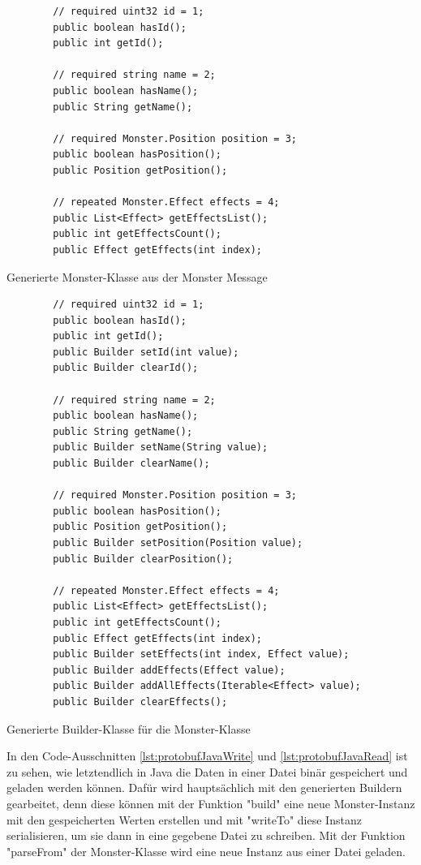 \begin{listing}[htp]
    \begin{verbatim} 
        // required uint32 id = 1;
        public boolean hasId();
        public int getId();

        // required string name = 2;
        public boolean hasName();
        public String getName();

        // required Monster.Position position = 3;
        public boolean hasPosition();
        public Position getPosition();

        // repeated Monster.Effect effects = 4;
        public List<Effect> getEffectsList();
        public int getEffectsCount();
        public Effect getEffects(int index);
    \end{verbatim}
    \caption{Generierte Monster-Klasse aus der Monster Message}
    \label{lst:protoJavaGeneratedMonster}
\end{listing}

\begin{listing}[htp]
    \begin{verbatim} 
        // required uint32 id = 1;
        public boolean hasId();
        public int getId();
        public Builder setId(int value);
        public Builder clearId();

        // required string name = 2;
        public boolean hasName();
        public String getName();
        public Builder setName(String value);
        public Builder clearName();

        // required Monster.Position position = 3;
        public boolean hasPosition();
        public Position getPosition();
        public Builder setPosition(Position value);
        public Builder clearPosition();

        // repeated Monster.Effect effects = 4;
        public List<Effect> getEffectsList();
        public int getEffectsCount();
        public Effect getEffects(int index);
        public Builder setEffects(int index, Effect value);
        public Builder addEffects(Effect value);
        public Builder addAllEffects(Iterable<Effect> value);
        public Builder clearEffects();
    \end{verbatim}
    \caption{Generierte Builder-Klasse für die Monster-Klasse}
    \label{lst:protoJavaGeneratedBuilder}
\end{listing}

In den Code-Ausschnitten \ref{lst:protobufJavaWrite} und \ref{lst:protobufJavaRead} ist zu sehen, wie letztendlich in Java die Daten in einer Datei binär gespeichert und geladen werden können. Dafür wird hauptsächlich mit den generierten Buildern gearbeitet, denn diese können mit der Funktion "build" eine neue Monster-Instanz mit den gespeicherten Werten erstellen und mit "writeTo" diese Instanz serialisieren, um sie dann in eine gegebene Datei zu schreiben. Mit der Funktion "parseFrom" der Monster-Klasse wird eine neue Instanz aus einer Datei geladen. 

